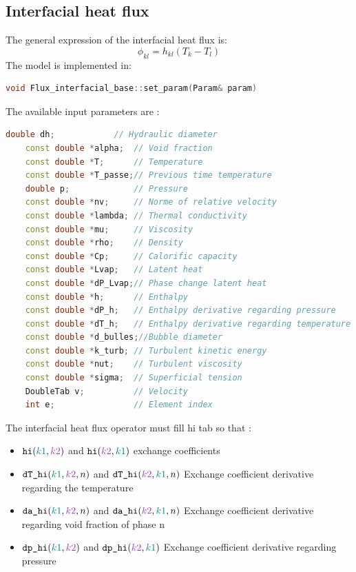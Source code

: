 \subsection{Interfacial heat flux}\label{sec:phyical_modeling_interface_heat_flux}
The general expression of the interfacial heat flux is:
\begin{equation}
    \phi_{kl}=h_{kl}(T_k-T_l)
\end{equation}
The model is implemented in:
\begin{lstlisting}[language=c++]
void Flux_interfacial_base::set_param(Param& param)
\end{lstlisting}
The available input parameters are : 
\begin{lstlisting}[language=c++]
    double dh;            // Hydraulic diameter
    const double *alpha;  // Void fraction 
    const double *T;      // Temperature
    const double *T_passe;// Previous time temperature
    double p;             // Pressure 
    const double *nv;     // Norme of relative velocity
    const double *lambda; // Thermal conductivity
    const double *mu;     // Viscosity
    const double *rho;    // Density
    const double *Cp;     // Calorific capacity
    const double *Lvap;   // Latent heat 
    const double *dP_Lvap;// Phase change latent heat
    const double *h;      // Enthalpy
    const double *dP_h;   // Enthalpy derivative regarding pressure
    const double *dT_h;   // Enthalpy derivative regarding temperature
    const double *d_bulles;//Bubble diameter
    const double *k_turb; // Turbulent kinetic energy
    const double *nut;    // Turbulent viscosity
    const double *sigma;  // Superficial tension
    DoubleTab v;          // Velocity
    int e;                // Element index
\end{lstlisting}
The interfacial heat flux operator must fill hi tab so that :
\begin{itemize}
    \item[\small \textcolor{blue}{\ding{109}}]$\texttt{hi}({\color{myteal}k1}, {\color{mydarkorchid}k2})$ and $\texttt{hi}({\color{mydarkorchid}k2},{\color{myteal}k1})$ exchange coefficients
    \item[\small \textcolor{blue}{\ding{109}}]$\texttt{dT\_hi}({\color{myteal}k1}, {\color{mydarkorchid}k2},n)$ and $\texttt{dT\_hi}({\color{mydarkorchid}k2},{\color{myteal}k1},n)$ Exchange coefficient derivative regarding the temperature
    \item[\small \textcolor{blue}{\ding{109}}]$\texttt{da\_hi}({\color{myteal}k1}, {\color{mydarkorchid}k2}, n)$ and $\texttt{da\_hi}({\color{mydarkorchid}k2}, {\color{myteal}k1}, n)$ Exchange coefficient derivative regarding  void fraction of phase n
    \item[\small \textcolor{blue}{\ding{109}}]$\texttt{dp\_hi}({\color{myteal}k1}, {\color{mydarkorchid}k2})$ and $\texttt{dp\_hi}({\color{mydarkorchid}k2}, {\color{myteal}k1})$ Exchange coefficient derivative regarding pressure 
\end{itemize}

